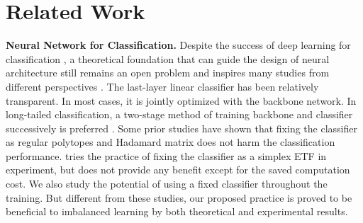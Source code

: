 \documentclass{article}
\newcommand{\<}{\left\langle}
\renewcommand{\>}{\right\rangle}
\begin{document}
\section{Related Work}
\vspace{-2mm}




\textbf{Neural Network for Classification.} Despite the success of deep learning for classification \cite{le2014distributed,vgg,he2016deep,huang2017densely,yang2018convolutional,hershey2017cnn}, a theoretical foundation that can guide the design of neural architecture still remains an open problem and inspires many studies from different perspectives \cite{ge2018learning,mei2018mean,li2018optimization,yang2019dynamical,arora2019fine,NTK,xiao2020disentangling}. The last-layer linear classifier has been relatively transparent. In most cases, it is jointly optimized with the backbone network. In long-tailed classification, a two-stage method of training backbone and classifier successively is preferred \cite{Cao_nips,kang2019decoupling,zhong2021improving}. Some prior studies have shown that fixing the classifier as regular polytopes \cite{pernici2019maximally,pernici2021regular} and Hadamard matrix \cite{hoffer2018fix} does not harm the classification performance. 
\cite{zhu2021geometric} tries the practice of fixing the classifier as a simplex ETF in experiment, but does not provide any benefit except for the saved computation cost.
We also study the potential of using a fixed classifier throughout the training. But different from these studies, our proposed practice is proved to be beneficial to imbalanced learning by both theoretical and experimental results.














\vspace{-1mm}
\end{document}

